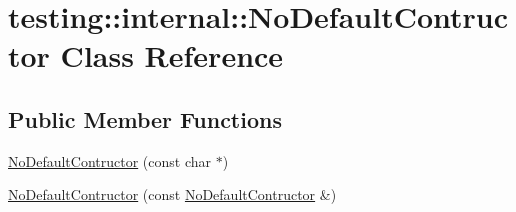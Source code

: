 \hypertarget{classtesting_1_1internal_1_1_no_default_contructor}{\section{testing\-:\-:internal\-:\-:No\-Default\-Contructor Class Reference}
\label{classtesting_1_1internal_1_1_no_default_contructor}
}
\subsection*{Public Member Functions}
\begin{DoxyCompactItemize}
\item 
\hyperlink{classtesting_1_1internal_1_1_no_default_contructor_a34c9cdf833476a9718141dcff931ba42}{No\-Default\-Contructor} (const char $\ast$)
\item 
\hyperlink{classtesting_1_1internal_1_1_no_default_contructor_acba74b55a8c5341808ecb5b9318eaecf}{No\-Default\-Contructor} (const \hyperlink{classtesting_1_1internal_1_1_no_default_contructor}{No\-Default\-Contructor} \&)
\end{DoxyCompactItemize}


